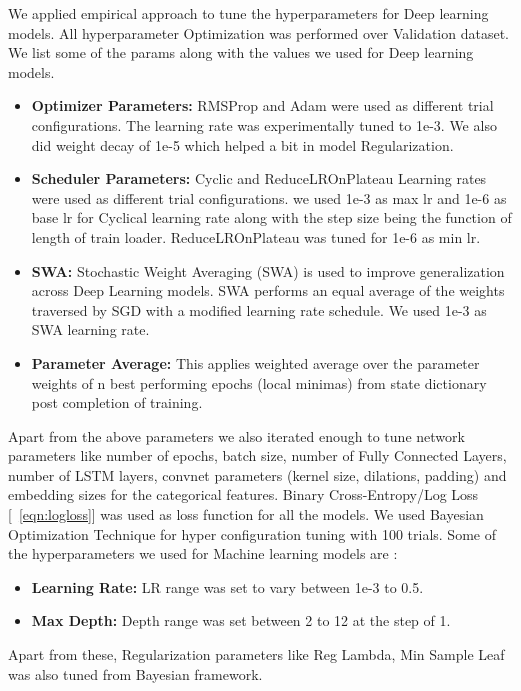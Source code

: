 We applied empirical approach to tune the hyperparameters for Deep learning models. All hyperparameter Optimization
was performed over Validation dataset. We list some of the params along with the values we used for Deep learning models.
  \begin{itemize}
    \item {\bf Optimizer Parameters:} RMSProp and Adam were used as different trial configurations. The learning rate 
    was experimentally tuned to 1e-3. We also did weight decay of 1e-5 which helped a bit in model Regularization.
    \item {\bf Scheduler Parameters:} Cyclic and ReduceLROnPlateau Learning rates were used as different trial configurations.
    we used 1e-3 as max lr and 1e-6 as base lr for Cyclical learning rate along with the step size being the function of
    length of train loader. ReduceLROnPlateau was tuned for 1e-6 as min lr.
    \item {\bf SWA:} Stochastic Weight Averaging (SWA) is used to improve generalization across Deep Learning
    models. SWA performs an equal average of the weights traversed by SGD with a modified learning rate schedule. We used 
    1e-3 as SWA learning rate.
    \item {\bf Parameter Average:} This applies weighted average over the parameter weights of n best performing epochs 
    (local minimas) from state dictionary post completion of training.
  \end{itemize}
Apart from the above parameters we also iterated enough to tune network parameters like number of epochs, batch size, 
number of Fully Connected Layers, number of LSTM layers, convnet parameters (kernel size, dilations, padding)
and embedding sizes for the categorical features. Binary Cross-Entropy/Log Loss [~\ref{eqn:logloss}] was used as loss 
function for all the models. 
We used Bayesian Optimization Technique for hyper configuration tuning with 100 trials.
Some of the hyperparameters we used for Machine learning models are :
  \begin{itemize}
    \item {\bf Learning Rate:} LR range was set to vary between 1e-3 to 0.5. 
    \item {\bf Max Depth:} Depth range was set between 2 to 12 at the step of 1.
  \end{itemize}
Apart from these, Regularization parameters like Reg Lambda, Min Sample Leaf was also tuned from Bayesian framework.

